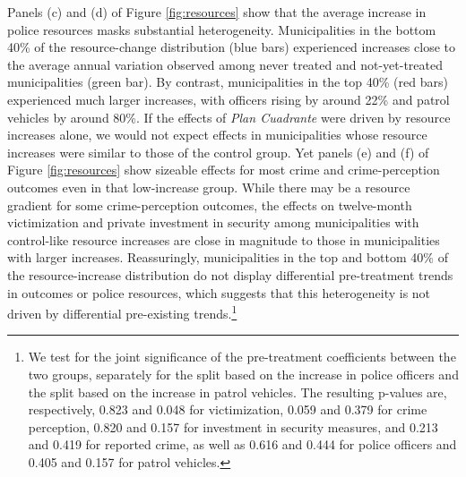 \FloatBarrier

\FloatBarrier
Panels (c) and (d) of Figure \ref{fig:resources} show that the average increase in police resources masks substantial heterogeneity. Municipalities in the bottom 40\% of the resource-change distribution (blue bars) experienced increases close to the average annual variation observed among never treated and not-yet-treated municipalities (green bar). By contrast, municipalities in the top 40\% (red bars) experienced much larger increases, with officers rising by around 22\% and patrol vehicles by around 80\%. If the effects of \emph{Plan Cuadrante} were driven by resource increases alone, we would not expect effects in municipalities whose resource increases were similar to those of the control group. Yet panels (e) and (f) of Figure \ref{fig:resources} show sizeable effects for most crime and crime-perception outcomes even in that low-increase group. While there may be a resource gradient for some crime-perception outcomes, the effects on twelve-month victimization and private investment in security among municipalities with control-like resource increases are close in magnitude to those in municipalities with larger increases. Reassuringly, municipalities in the top and bottom 40\% of the resource-increase distribution do not display differential pre-treatment trends in outcomes or police resources, which suggests that this heterogeneity is not driven by differential pre-existing trends.\footnote{We test for the joint significance of the pre-treatment coefficients between the two groups, separately for the split based on the increase in police officers and the split based on the increase in patrol vehicles. The resulting p-values are, respectively, 0.823 and 0.048 for victimization, 0.059 and 0.379 for crime perception, 0.820 and 0.157 for investment in security measures, and 0.213 and 0.419 for reported crime, as well as 0.616 and 0.444 for police officers and 0.405 and 0.157 for patrol vehicles.}

